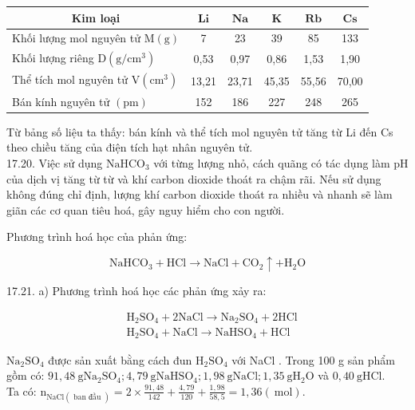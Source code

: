 \documentclass[10pt]{article}
\begin{document}
\begin{center}
\begin{tabular}{|l|c|c|c|c|c|}
\hline
\multicolumn{1}{|c|}{Kim loại} & $\mathbf{L i}$ & $\mathbf{N a}$ & $\mathbf{K}$ & $\mathbf{R b}$ & $\mathbf{C s}$ \\
\hline
Khối lượng mol nguyên tử $\mathrm{M}(\mathrm{g})$ & 7 & 23 & 39 & 85 & 133 \\
\hline
Khối lượng riêng $\mathrm{D}\left(\mathrm{g} / \mathrm{cm}^{3}\right)$ & 0,53 & 0,97 & 0,86 & 1,53 & 1,90 \\
\hline
Thể tích mol nguyên tử $\mathrm{V}\left(\mathrm{cm}^{3}\right)$ & 13,21 & 23,71 & 45,35 & 55,56 & 70,00 \\
\hline
Bán kính nguyên tử $(\mathrm{pm})$ & 152 & 186 & 227 & 248 & 265 \\
\hline
\end{tabular}
\end{center}

Từ bảng số liệu ta thấy: bán kính và thể tích mol nguyên tử tăng từ Li đến Cs theo chiều tăng của điện tích hạt nhân nguyên tử.\\
17.20. Việc sử dụng $\mathrm{NaHCO}_{3}$ với từng lượng nhỏ, cách quãng có tác dụng làm pH của dịch vị tăng từ từ và khí carbon dioxide thoát ra chậm rãi. Nếu sử dụng không đúng chỉ định, lượng khí carbon dioxide thoát ra nhiều và nhanh sẽ làm giãn các cơ quan tiêu hoá, gây nguy hiểm cho con người.

Phương trình hoá học của phản ứng:

$$
\mathrm{NaHCO}_{3}+\mathrm{HCl} \rightarrow \mathrm{NaCl}+\mathrm{CO}_{2} \uparrow+\mathrm{H}_{2} \mathrm{O}
$$

17.21. a) Phương trình hoá học các phản ứng xảy ra:

$$
\begin{aligned}
& \mathrm{H}_{2} \mathrm{SO}_{4}+2 \mathrm{NaCl} \rightarrow \mathrm{Na}_{2} \mathrm{SO}_{4}+2 \mathrm{HCl} \\
& \mathrm{H}_{2} \mathrm{SO}_{4}+\mathrm{NaCl} \rightarrow \mathrm{NaHSO}_{4}+\mathrm{HCl}
\end{aligned}
$$

$\mathrm{Na}_{2} \mathrm{SO}_{4}$ được sản xuất bằng cách đun $\mathrm{H}_{2} \mathrm{SO}_{4}$ với NaCl . Trong 100 g sản phẩm gồm có: $91,48 \mathrm{~g} \mathrm{Na}_{2} \mathrm{SO}_{4} ; 4,79 \mathrm{~g} \mathrm{NaHSO}_{4} ; 1,98 \mathrm{~g} \mathrm{NaCl} ; 1,35 \mathrm{~g} \mathrm{H}_{2} \mathrm{O}$ và $0,40 \mathrm{~g} \mathrm{HCl}$.\\
Ta có: $\mathrm{n}_{\mathrm{NaCl}(\text { ban đầu })}=2 \times \frac{91,48}{142}+\frac{4,79}{120}+\frac{1,98}{58,5}=1,36(\mathrm{~mol})$.
\end{document}
